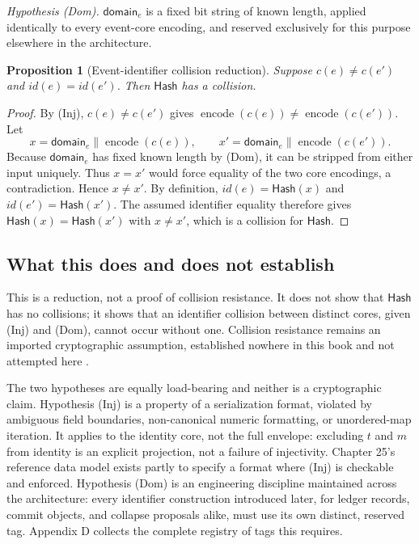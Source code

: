 \documentclass[11pt,openany]{book}
\newtheorem{proposition}[definition]{Proposition}
\newcommand{\Hash}{\mathsf{Hash}}
\begin{document}
\textit{Hypothesis (Dom).} \(\mathsf{domain}_e\) is a fixed bit string of
known length, applied identically to every event-core encoding, and reserved
exclusively for this purpose elsewhere in the architecture.

\begin{proposition}[Event-identifier collision reduction]
Suppose \(c(e)\neq c(e')\) and \(id(e)=id(e')\). Then \(\Hash\) has a
collision.
\end{proposition}

\begin{proof}
By (Inj), \(c(e)\neq c(e')\) gives
\(\operatorname{encode}(c(e))\neq\operatorname{encode}(c(e'))\). Let
\[
 x=\mathsf{domain}_e\parallel\operatorname{encode}(c(e)),
 \qquad
 x'=\mathsf{domain}_e\parallel\operatorname{encode}(c(e')).
\]
Because \(\mathsf{domain}_e\) has fixed known length by (Dom), it can be
stripped from either input uniquely. Thus \(x=x'\) would force equality of the
two core encodings, a contradiction. Hence \(x\neq x'\). By definition,
\(id(e)=\Hash(x)\) and \(id(e')=\Hash(x')\). The assumed identifier equality
therefore gives \(\Hash(x)=\Hash(x')\) with \(x\neq x'\), which is a collision
for \(\Hash\).
\end{proof}

\subsection{What this does and does not establish}

This is a reduction, not a proof of collision resistance. It does not show
that \(\Hash\) has no collisions; it shows that an identifier collision
between distinct cores, given (Inj) and (Dom), cannot occur without one.
Collision resistance remains an imported cryptographic assumption, established
nowhere in this book and not attempted here \cite{katz-lindell}.

The two hypotheses are equally load-bearing and neither is a cryptographic
claim. Hypothesis (Inj) is a property of a serialization format, violated by
ambiguous field boundaries, non-canonical numeric formatting, or unordered-map
iteration. It applies to the identity core, not the full envelope: excluding
\(t\) and \(m\) from identity is an explicit projection, not a failure of
injectivity. Chapter 25's reference data model exists partly to specify a
format where (Inj) is checkable and enforced. Hypothesis (Dom) is an
engineering discipline maintained across the architecture: every identifier
construction introduced later, for ledger records, commit objects, and
collapse proposals alike, must use its own distinct, reserved tag. Appendix D
collects the complete registry of tags this requires.
\end{document}
